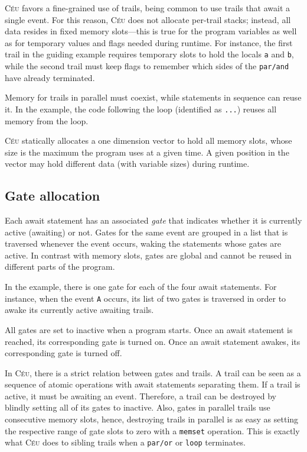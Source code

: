 \documentclass[11pt,a4paper]{article}
\newcommand{\2}{\;\;}
\newcommand{\5}{\;\;\;\;\;}
\newcommand{\CEU}{\textsc{C\'{e}u}}
\newcommand{\code}[1] {{\small{\texttt{#1}}}}
\begin{document}
\CEU{} favors a fine-grained use of trails, being common to use trails that 
await a single event.
For this reason, \CEU{} does not allocate per-trail stacks; instead, all data 
resides in fixed memory slots---this is true for the program variables as well 
as for temporary values and flags needed during runtime.
For instance, the first trail in the guiding example requires temporary slots 
to hold the locals \code{a} and \code{b}, while the second trail must keep 
flags to remember which sides of the \code{par/and} have already terminated.

Memory for trails in parallel must coexist, while statements in sequence can 
reuse it.
In the example, the code following the loop (identified as \code{...}) reuses 
all memory from the loop.

\CEU{} statically allocates a one dimension vector to hold all memory slots, 
whose size is the maximum the program uses at a given time.
A given position in the vector may hold different data (with variable sizes) 
during runtime.

\subsection{Gate allocation}
\label{sec:impl:gates}

Each await statement has an associated \emph{gate} that indicates whether it is 
currently active (awaiting) or not.
Gates for the same event are grouped in a list that is traversed whenever the 
event occurs, waking the statements whose gates are active.
In contrast with memory slots, gates are global and cannot be reused in 
different parts of the program.

In the example, there is one gate for each of the four await statements.
For instance, when the event \code{A} occurs, its list of two gates is 
traversed in order to awake its currently active awaiting trails.

All gates are set to inactive when a program starts.
Once an await statement is reached, its corresponding gate is turned on.
Once an await statement awakes, its corresponding gate is turned off.

In \CEU, there is a strict relation between gates and trails.
A trail can be seen as a sequence of atomic operations with await statements
separating them.
If a trail is active, it must be awaiting an event.
Therefore, a trail can be destroyed by blindly setting all of its gates to 
inactive.
Also, gates in parallel trails use consecutive memory slots, hence, destroying 
trails in parallel is as easy as setting the respective range of gate slots to 
zero with a \code{memset} operation.
This is exactly what \CEU{} does to sibling trails when a \code{par/or} or 
\code{loop} terminates.
\end{document}

